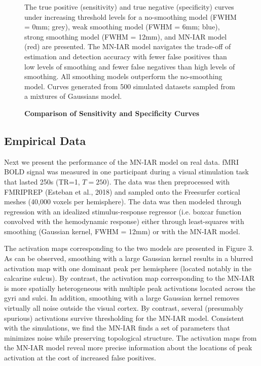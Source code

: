 \documentclass[9pt]{NEU560-final}
\begin{document}
\begin{figure}
\centerline{%
%
}
\caption{\textbf{Comparison of Sensitivity and Specificity Curves}}
\par The true positive (sensitivity) and true negative (specificity) curves under increasing threshold levels for a no-smoothing model (FWHM = 0mm; grey), weak smoothing model (FWHM = 6mm; blue), strong smoothing model (FWHM = 12mm), and MN-IAR model (red) are presented. The MN-IAR model navigates the trade-off of estimation and detection accuracy with fewer false positives than low levels of smoothing and fewer false negatives than high levels of smoothing. All smoothing models outperform the no-smoothing model. Curves generated from 500 simulated datasets sampled from a mixtures of Gaussians model.
\end{figure}

\subsection{Empirical Data}
Next we present the performance of the MN-IAR model on real data. fMRI BOLD signal was measured in one participant during a visual stimulation task that lasted 250s (TR=1, $T=250$). The data was then preprocessed with FMRIPREP (Esteban et al., 2018) and sampled onto the Freesurfer cortical meshes (40,000 voxels per hemisphere). The data was then modeled through regression with an idealized stimulus-response regressor (i.e. boxcar function convolved with the hemodynamic response) either through least-squares with smoothing (Gaussian kernel, FWHM = 12mm) or with the MN-IAR model. 

The activation maps corresponding to the two models are presented in Figure 3. As can be observed, smoothing with a large Gaussian kernel results in a blurred activation map with one dominant peak per hemisphere (located notably in the calcarine sulcus). By contrast, the activation map corresponding to the MN-IAR is more spatially heterogeneous with multiple peak activations located across the gyri and sulci. In addition, smoothing with a large Gaussian kernel removes virtually all noise outside the visual cortex. By contrast, several (presumably spurious) activations survive thresholding for the MN-IAR model. Consistent with the simulations, we find the MN-IAR finds a set of parameters that minimizes noise while preserving topological structure. The activation maps from the MN-IAR model reveal more precise information about the locations of peak activation at the cost of increased false positives.  
\end{document}
